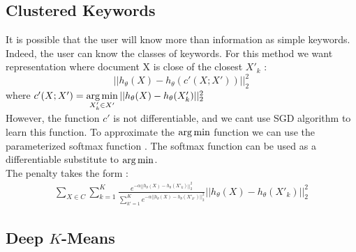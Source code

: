 \subsection{Clustered Keywords}
It is possible that the user will know more than
information as simple keywords. Indeed, the user can know the 
classes of keywords. 
For this method we want representation where document X is close of the closest
$X'_k$ : 
\begin{equation}
|| h_\theta(X) - h_\theta(c'(X ; X' )) ||_2^2
\end{equation}
where $c'(X ; X') = \operatorname*{arg\,min}\limits_{X'_k \in X'} ||h_\theta(X) - h_\theta(X'_k) ||_2^2$\\ 
However, the  function $c'$ is not differentiable, and we cant use SGD algorithm
\cite{doi:10.1080/01621459.1982.10477894}
to learn this function. To approximate the $\operatorname*{arg\,min}$ function we can use the 
parameterized softmax function \cite{doi:10.1117/1.2819119}. The softmax 
function can be used as a differentiable substitute to $\operatorname*{arg\,min}$. 
\\The penalty takes the form : 
\begin{equation}\label{eq:omega_kw_soft}
\begin{array}{l}
  \sum\limits_{X \in C} \sum\limits_{k = 1}^K \frac{e^{-\alpha|| h_\theta(X) - 
h_\theta(X'_k)||_2^2}}{\sum\limits_{k' = 1}^K e^{-\alpha|| h_\theta(X) - 
h_\theta(X'_{k'})||_2^2}}|| h_\theta(X) - h_\theta(X'_{k})||_2^2
\end{array}
\end{equation}

\subsection{Deep $K$-Means}

